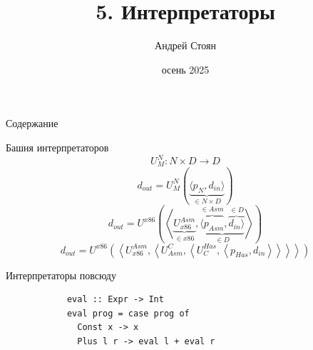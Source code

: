 
\newif\ifhandout



\newcommand{\iso}{\sim}

\title{5. Интерпретаторы}
\author{Андрей Стоян}

\date{осень 2025}



    \mymaketitle

    \begin{frame}[noframenumbering]{Содержание}
        \tableofcontents
    \end{frame}


    \begin{frame}[fragile]{Башня интерпретаторов}
        \pause
        \[U_M^N : N\times D\to D\]
        \pause
        \[d_{out} = U_M^N\left( \underbrace{\langle p_N, d_{in} \rangle}_{\in N\times D} \right)\]
        \pause
        \[
            d_{out} = U^{x86}\left(\left<\underbrace{U_{x86}^{Asm}}_{\in x86}, \underbrace{\overbrace{\langle p_{Asm}}^{\in Asm}, \overbrace{d_{in} \rangle}^{\in D}}_{\in D} \right>\right)
        \]
        \pause
        \[
            d_{out} =
            U^{x86}\left(\left<
                             U_{x86}^{Asm}, \left<
                                                U^C_{Asm}, \left<
                                                               U^{Has}_C, \left< p_{Has}, d_{in}
                        \right>\right>\right>\right>\right)
        \]
    \end{frame}

    \begin{frame}[fragile]{Интерпретаторы повсюду}
        \pause
        \begin{verbatim}
            eval :: Expr -> Int
            eval prog = case prog of
              Const x -> x
              Plus l r -> eval l + eval r
        \end{verbatim}
    \end{frame}

